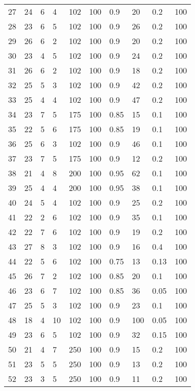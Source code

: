 \begin{center}
\begin{longtable}{l|lllllllll}
        27 & 24 & 6 & 4 & 102 & 100 & 0.9 & 20 & 0.2 & 100 \\ 
        28 & 23 & 6 & 5 & 102 & 100 & 0.9 & 26 & 0.2 & 100 \\ 
        29 & 26 & 6 & 2 & 102 & 100 & 0.9 & 20 & 0.2 & 100 \\ 
        30 & 23 & 4 & 5 & 102 & 100 & 0.9 & 24 & 0.2 & 100 \\ 
        31 & 26 & 6 & 2 & 102 & 100 & 0.9 & 18 & 0.2 & 100 \\ 
        32 & 25 & 5 & 3 & 102 & 100 & 0.9 & 42 & 0.2 & 100 \\ 
        33 & 25 & 4 & 4 & 102 & 100 & 0.9 & 47 & 0.2 & 100 \\ 
        34 & 23 & 7 & 5 & 175 & 100 & 0.85 & 15 & 0.1 & 100 \\ 
        35 & 22 & 5 & 6 & 175 & 100 & 0.85 & 19 & 0.1 & 100 \\ 
        36 & 25 & 6 & 3 & 102 & 100 & 0.9 & 46 & 0.1 & 100 \\ 
        37 & 23 & 7 & 5 & 175 & 100 & 0.9 & 12 & 0.2 & 100 \\ 
        38 & 21 & 4 & 8 & 200 & 100 & 0.95 & 62 & 0.1 & 100 \\ 
        39 & 25 & 4 & 4 & 200 & 100 & 0.95 & 38 & 0.1 & 100 \\ 
        40 & 24 & 5 & 4 & 102 & 100 & 0.9 & 25 & 0.2 & 100 \\ 
        41 & 22 & 2 & 6 & 102 & 100 & 0.9 & 35 & 0.1 & 100 \\ 
        42 & 22 & 7 & 6 & 102 & 100 & 0.9 & 19 & 0.2 & 100 \\ 
        43 & 27 & 8 & 3 & 102 & 100 & 0.9 & 16 & 0.4 & 100 \\ 
        44 & 22 & 5 & 6 & 102 & 100 & 0.75 & 13 & 0.13 & 100 \\ 
        45 & 26 & 7 & 2 & 102 & 100 & 0.85 & 20 & 0.1 & 100 \\ 
        46 & 23 & 6 & 7 & 102 & 100 & 0.85 & 36 & 0.05 & 100 \\ 
        47 & 25 & 5 & 3 & 102 & 100 & 0.9 & 23 & 0.1 & 100 \\ 
        48 & 18 & 4 & 10 & 102 & 100 & 0.9 & 100 & 0.05 & 100 \\ 
        49 & 23 & 6 & 5 & 102 & 100 & 0.9 & 32 & 0.15 & 100 \\ 
        50 & 21 & 4 & 7 & 250 & 100 & 0.9 & 15 & 0.2 & 100 \\ 
        51 & 23 & 5 & 5 & 250 & 100 & 0.9 & 13 & 0.2 & 100 \\ 
        52 & 23 & 3 & 5 & 250 & 100 & 0.9 & 11 & 0.2 & 100 \\ 

\end{longtable}
\end{center}
